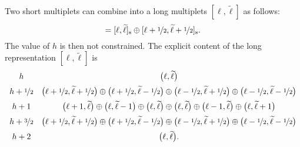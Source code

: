 \documentclass[a4paper, 11pt]{article}
\numberwithin{equation}{section}
\newcommand{\ts}[1]{\widetilde{#1}}
\newcommand{\+}{\oplus}
\begin{document}
Two short multiplets can combine into a long multiplets $[\ell,\ts{\ell}]$ as follows:
\begin{equation}
 	[\ell,\ts{\ell}] = [\ell,\ts{\ell}]_{\rm s} \oplus [\ell+\nicefrac{1}{2},\ts{\ell}+\nicefrac{1}{2}]_{\rm s}.
\end{equation}
The value of $h$ is then not constrained. The explicit content of the long representation $[\ell,\ts{\ell}]$  is
\begin{equation}
	\begin{array}{cc}
	 h & \big(\ell,\ts{\ell}\big) \\[5pt]
	 h + \nicefrac{1}{2} & \big(\ell+\nicefrac{1}{2},\ts{\ell}+\nicefrac{1}{2}\big) \oplus\big(\ell+\nicefrac{1}{2},\ts{\ell}-\nicefrac{1}{2}\big) \oplus \big(\ell-\nicefrac{1}{2},\ts{\ell}+\nicefrac{1}{2}\big) \oplus \big(\ell-\nicefrac{1}{2},\ts{\ell}-\nicefrac{1}{2}\big) \\[5pt]
	 h+1 & \big(\ell+1,\ts{\ell}\big) \oplus \big(\ell,\ts{\ell}-1\big) \oplus \big(\ell,\ts{\ell}\big) \oplus \big(\ell,\ts{\ell}\big) \oplus \big(\ell-1,\ts{\ell}\big)\oplus \big(\ell,\ts{\ell}+1\big) \\[5pt]
	 h + \nicefrac{3}{2} & \big(\ell+\nicefrac{1}{2},\ts{\ell}+\nicefrac{1}{2}\big) \oplus\big(\ell+\nicefrac{1}{2},\ts{\ell}-\nicefrac{1}{2}\big) \oplus \big(\ell-\nicefrac{1}{2},\ts{\ell}+\nicefrac{1}{2}\big) \oplus \big(\ell-\nicefrac{1}{2},\ts{\ell}-\nicefrac{1}{2}\big) \\[5pt]
	 h + 2 & \big(\ell,\ts{\ell}\big).
	\end{array}
\end{equation}
	


	
\end{document}
